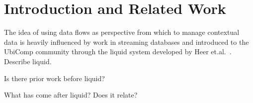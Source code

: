 \section{Introduction and Related Work}

The idea of using data flows as perspective from which to manage contextual data
is heavily influenced by work in streaming databases and introduced to the
UbiComp community through the liquid system developed by Heer
et.al.~\cite{HeerNBH03}. Describe liquid.

Is there prior work before liquid?

What has come after liquid?  Does it relate?
\cite{Hong2004}


